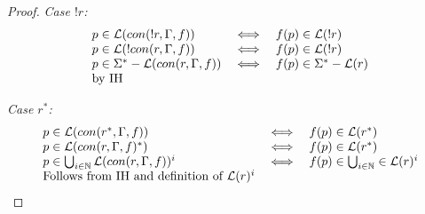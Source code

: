 \documentclass[twocolumn, openany]{sig-alternate-10pt}
\newtheorem{defn}{Definition}
\newtheorem{lem}[thm]{Lemma}
\begin{document}
\begin{proof}
\emph{Case $!r$:}
  \[ \begin{array}{lll}
    p \in \mathcal{L}(con(!r,\Gamma,f)) &\iff& f(p) \in \mathcal{L}(!r) \\
    p \in \mathcal{L}(!con(r,\Gamma,f)) &\iff& f(p) \in \mathcal{L}(!r) \\
    p \in \Sigma^* - \mathcal{L}(con(r,\Gamma,f)) &\iff& f(p) \in \Sigma^* - \mathcal{L}(r) \\
    \text{by IH} & & \\
  \end{array} \]

\emph{Case $r^*$:}
  \[ \begin{array}{lll}
    p \in \mathcal{L}(con(r^*,\Gamma,f)) &\iff& f(p) \in \mathcal{L}(r^*) \\
    p \in \mathcal{L}(con(r,\Gamma,f)^*) &\iff& f(p) \in \mathcal{L}(r^*) \\
    p \in \bigcup_{i \in \mathbb{N}} \mathcal{L}(con(r,\Gamma,f))^i &\iff& f(p) \in \bigcup_{i \in \mathbb{N}} \in \mathcal{L}(r)^i \\
    \text{Follows from IH and definition of } \mathcal{L}(r)^i & & \\
  \end{array} \]

\end{proof}






%


\end{document}

